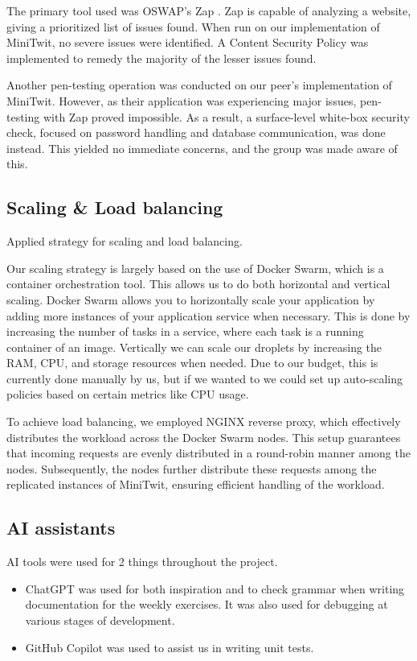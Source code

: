 The primary tool used was OSWAP's Zap \cite{zap}. Zap is capable of analyzing a website, giving a prioritized list of issues found. When run on our implementation of MiniTwit, no severe issues were identified. A Content Security Policy was implemented to remedy the majority of the lesser issues found.

Another pen-testing operation was conducted on our peer's implementation of MiniTwit. However, as their application was experiencing major issues, pen-testing with Zap proved impossible. As a result, a surface-level white-box security check, focused on password handling and database communication, was done instead. This yielded no immediate concerns, and the group was made aware of this.

\subsection{Scaling \& Load balancing}
Applied strategy for scaling and load balancing.

Our scaling strategy is largely based on the use of Docker Swarm, which is a container orchestration tool. This allows us to do both horizontal and vertical scaling. Docker Swarm allows you to horizontally scale your application by adding more instances of your application service when necessary. This is done by increasing the number of tasks in a service, where each task is a running container of an image. Vertically we can scale our droplets by increasing the RAM, CPU, and storage resources when needed. Due to our budget, this is currently done manually by us, but if we wanted to we could set up auto-scaling policies based on certain metrics like CPU usage.

To achieve load balancing, we employed NGINX reverse proxy, which effectively distributes the workload across the Docker Swarm nodes. This setup guarantees that incoming requests are evenly distributed in a round-robin manner among the nodes. Subsequently, the nodes further distribute these requests among the replicated instances of MiniTwit, ensuring efficient handling of the workload.

\subsection{AI assistants}
AI tools were used for 2 things throughout the project.
\begin{itemize}
    \item ChatGPT \cite{chatgpt} was used for both inspiration and to check grammar when writing documentation for the weekly exercises. It was also used for debugging at various stages of development. 
    \item GitHub Copilot \cite{copilot} was used to assist us in writing unit tests.
\end{itemize}